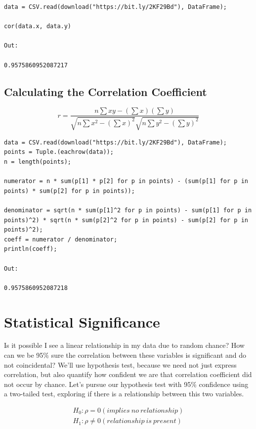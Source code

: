 \documentclass[a4paper, 11pt]{article}
\begin{document}
\begin{lstlisting}[label={lst:corrcoff},caption={The Correlation Coefficient calculated with standard library function}]
data = CSV.read(download("https://bit.ly/2KF29Bd"), DataFrame);

cor(data.x, data.y)

Out:

0.9575860952087217
\end{lstlisting}

\subsection{Calculating the Correlation Coefficient}

\begin{equation}
r =\frac{n\sum xy - (\sum x)(\sum y)}{\sqrt{n \sum x^2 - (\sum x)^2} \sqrt{n \sum y^2 - (\sum y)^2}}
\end{equation}

\begin{lstlisting}[label={lst:corrcoeffhand},caption={Calculating the Correlation Coefficient}]
data = CSV.read(download("https://bit.ly/2KF29Bd"), DataFrame);
points = Tuple.(eachrow(data));
n = length(points);

numerator = n * sum(p[1] * p[2] for p in points) - (sum(p[1] for p in points) * sum(p[2] for p in points));

denominator = sqrt(n * sum(p[1]^2 for p in points) - sum(p[1] for p in points)^2) * sqrt(n * sum(p[2]^2 for p in points) - sum(p[2] for p in points)^2);
coeff = numerator / denominator;
println(coeff);

Out:

0.9575860952087218
\end{lstlisting}

\section{Statistical Significance}
Is it possible I see a linear relationship in my data due to random chance? How can we be 95\% sure the correlation between these variables is significant and do not coincidental? We'll use hypothesis test, because we need not just express correlation, but also quantify how confident we are that correlation coefficient did not occur by chance. Let's pursue our hypothesis test with 95\% confidence using a two-tailed test, exploring if there is a relationship between this two variables.

\begin{equation}
\begin{aligned}
H_0:\rho=0(implies\ no\ relationship) \\[5pt]
H_1:\rho \neq 0(relationship\ is\ present)
\end{aligned}
\end{equation}
\end{document}
